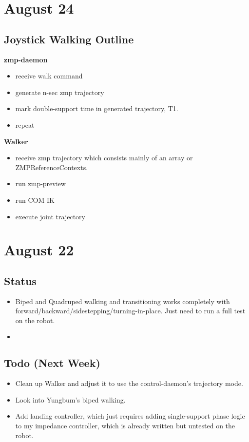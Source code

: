 \documentclass[letterpaper, 10 pt]{report}
\begin{document}
\section*{August 24}
\subsection*{Joystick Walking Outline}
\textbf{zmp-daemon}
\begin{itemize}
    \item receive walk command
    \item generate n-sec zmp trajectory
    \item mark double-support time in generated trajectory, T1. 
    \item repeat
\end{itemize}
\textbf{Walker}
\begin{itemize}
    \item receive zmp trajectory which consists mainly of an array or ZMPReferenceContexts. 
    \item run zmp-preview
    \item run COM IK
    \item execute joint trajectory
\end{itemize}

\section*{August 22}
\subsection*{Status}
\begin{itemize}
\item Biped and Quadruped walking and transitioning works completely with forward/backward/sidestepping/turning-in-place. Just need to run a full test on the robot.
\item
\end{itemize} 
\subsection*{Todo (Next Week)}
\begin{itemize}
\item Clean up Walker and adjust it to use the control-daemon's trajectory mode.
\item Look into Yungbum's biped walking.
\item Add landing controller, which just requires adding single-support phase logic to my impedance controller, which is already written but untested on the robot.
\end{itemize}
\end{document}
